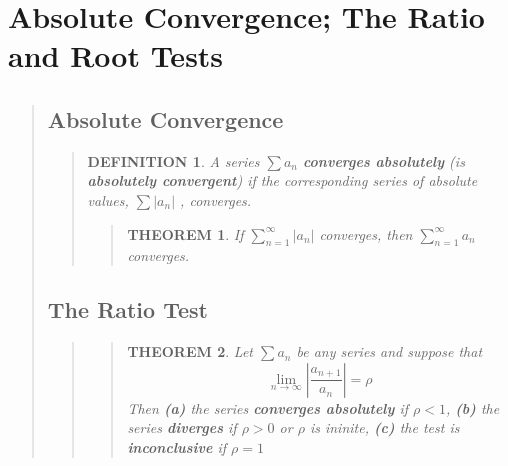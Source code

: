 \documentclass{report}
\newtheorem{theorem}{THEOREM}
\newtheorem*{definition}{DEFINITION}
\begin{document}

\section{Absolute Convergence; The Ratio and Root Tests }
\begin{quote}

		\subsection{Absolute Convergence}
		\begin{quote}

			\begin{definition}
				A series $\sum a_n$ \textbf{converges absolutely} (is \textbf{absolutely convergent})  if the corresponding series of absolute values, $\sum \left | a_n \right |$ , converges.
			\end{definition}

			\begin{quote}

				\begin{theorem}
					If $\sum_{n=1}^{\infty} \left | a_n \right | $ converges, then $ \sum_{n=1}^{\infty} a_n $ converges.
				\end{theorem}

			\end{quote}

		\end{quote}

	\subsection{The Ratio Test}
	\begin{quote}

		\begin{quote}
		\begin{theorem}
			Let $ \sum a_n $ be any series and suppose that
			$$\lim_{n \to \infty} \left | \frac{a_{n+1}}{a_n} \right | = \rho $$
			Then \textbf{(a)} the series \textbf{converges absolutely} if $\rho < 1$, \textbf{(b)} the series \textbf{diverges} if $ \rho > 0 $ or $\rho$ is ininite, \textbf{(c)} the test is \textbf{inconclusive} if $\rho = 1$
		\end{theorem}
		\end{quote}


\end{quote}
\end{quote}
\end{document}
